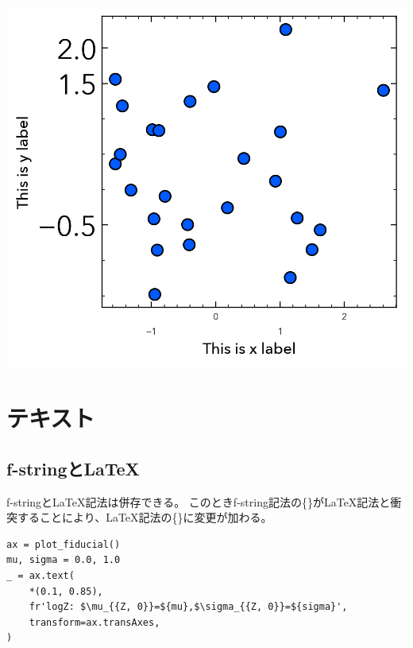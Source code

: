 \documentclass[a4paper, 10pt, notitlepage, twocolumn, uplatex, oneside, dvipdfmx]{jsarticle}
\begin{document}
\begin{center}
\includegraphics[width=1.0\linewidth]{./obipy-resources/params_ticks.png}
\end{center}
\section{テキスト}
\label{sec:org09f8468}

\subsection{f-stringと\LaTeX{}}
\label{sec:orgdf6c43e}
f-stringと\LaTeX{}記法は併存できる。
このときf-string記法の\{\}が\LaTeX{}記法と衝突することにより、\LaTeX{}記法の\{\}に変更が加わる。
\begin{verbatim}
ax = plot_fiducial()
mu, sigma = 0.0, 1.0
_ = ax.text(
    *(0.1, 0.85),
    fr'logZ: $\mu_{{Z, 0}}=${mu},$\sigma_{{Z, 0}}=${sigma}',
    transform=ax.transAxes,
)
\end{verbatim}
\end{document}
